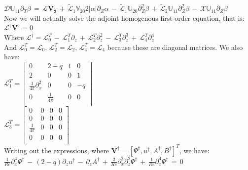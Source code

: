 \documentclass[letterpaper,12pt]{article}
\newcommand\reye{\mathrel{Re}}
\begin{document}
$\mathcal{D}\mathbb{U}_{11} \partial_T \beta \, = \, \mathcal{L}\mathbf{V_3} \, + \, \widetilde{\mathcal{L}}_1 \mathbb{V}_{20} 2 \left|\alpha\right| \partial_Z \alpha \, - \, \widetilde{\mathcal{L}}_1 \mathbb{U}_{20} \partial_Z^2 \beta \, + \, \widetilde{\mathcal{L}}_2 \mathbb{U}_{11} \partial_Z^2 \beta \, - \, \mathcal{X} \mathbb{U}_{11} \partial_Z \beta \, $\\

Now we will actually solve the adjoint homogenous first-order equation, that is: \\

$\mathcal{L}^\dagger \mathbf{V}^\dagger = 0$ \\ 

Where $\mathcal{L}^\dagger = \mathcal{L}_0^T \, - \, \mathcal{L}_1^T \partial_z \, + \, \mathcal{L}_2^T\partial_z^2 \, - \, \mathcal{L}_3^T \partial_z^3 \, + \, \mathcal{L}_4^T \partial_z^4$ \\

And $\mathcal{L}_0^T = \mathcal{L}_0$, $\mathcal{L}_2^T = \mathcal{L}_2$, $\mathcal{L}_4^T = \mathcal{L}_4$ because these are diagonal matrices. We also have:\\

$\mathcal{L}_1^T = \left[\begin{matrix}
0 & 2-q & 1 & 0 \\
2 & 0 & 0 & 1 \\
\frac{1}{4\pi} \partial_x^2 & 0 & 0 & -q\\
0 & \frac{1}{4\pi} & 0 & 0 \\
\end{matrix}\right]$ \\

$\mathcal{L}_3^T = \left[\begin{matrix}
0 & 0 & 0 & 0 \\
0 & 0 & 0 & 0 \\
\frac{1}{4\pi} & 0 & 0 & 0\\
0 & 0 & 0 & 0 \\
\end{matrix}\right]$ \\

Writing out the expressions, where $\mathbf{V}^\dagger = \left[\Psi^\dagger, u^\dagger, A^\dagger, B^\dagger\right]^T$, we have: \\

$\frac{1}{\reye}\partial_x^4 \Psi^\dagger \, - \, (2-q)\partial_z u^\dagger \, - \, \partial_z A^\dagger \, + \, \frac{2}{\reye}\partial_x^2 \partial_z^2 \Psi^\dagger \, + \, \frac{1}{\reye}\partial_z^4 \Psi^\dagger \, = \, 0$ \\
\end{document}
